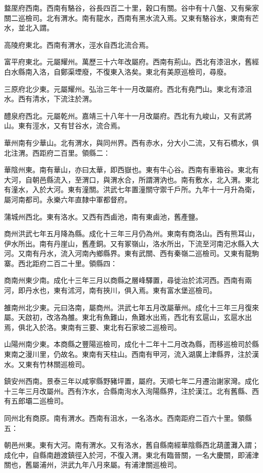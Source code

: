 盩厔府西南。西南有駱谷，谷長四百二十里，穀口有關。谷中有十八盤、又有柴家關二巡檢司。北有渭水。南有龍水，西南有黑水流入焉。又東有駱谷水，東南有芒水，並北入謂。

高陵府東北。西南有渭水，涇水自西北流合焉。

富平府東北。元屬耀州。萬歷三十六年改屬府。西南有荊山。西北有漆沮水，舊經白水縣南入洛，自鄭渠堙廢，不復東入洛矣。東北有美原巡檢司，尋廢。

三原府北少東。元屬耀州。弘治三年十一月改屬府。西北有堯門山。東北有漆沮水。西有清水，下流注於渭。

醴泉府西北。元屬乾州。嘉靖三十八年十一月改屬府。西北有九峻山，又有武將山。東有涇水，又有甘谷水，流合焉。

華州南有少華山。北有渭水，與同州界。西有赤水，分大小二流，又有石橋水，俱北注渭。西距府二百里。領縣二：

華陰州東。南有華山，亦曰太華，即西嶽也。東有牛心谷。西南有車箱谷。東北有大河，自朝邑縣流入，至渭口，與渭水合，所謂渭汭也。南有敷水，北入渭。東北有潼水，入於大河。東有潼關。洪武七年置潼關守禦千戶所。九年十一月升為衛，屬河南都司。永樂六年直隸中軍都督府。

蒲城州西北。東有洛水。又西有西鹵池，南有東鹵池，舊產鹽。

商州洪武七年五月降為縣。成化十三年三月仍為州。東南有商洛山。西有熊耳山，伊水所出。南有丹崖山，舊產銅。又有冢嶺山，洛水所出，下流至河南汜水縣入大河。又南有丹水，流入河南內鄉縣界。東有武關、西有秦嶺二巡檢司。又東有龍駒寨。西北距府二百二十里。領縣四：

商南州東少南。成化十三年三月以商縣之層峰驛置，尋徙治於沭河西。西南有兩河，即丹水也，東有沭河，南有挾川，俱入焉。東有富水堡巡檢司。

雒南州北少東。元曰洛南，屬商州。洪武七年五月改屬華州。成化十三年三月復來屬。天啟初，改洛為雒。東北有魚難山，魚難水出焉，西北有玄扈山，玄扈水出焉，俱北入於洛。東南有三要、東北有石家坡二巡檢司。

山陽州南少東。本商縣之豐陽巡檢司，成化十二年十二月改為縣，而移巡檢司於縣東南之漫川里，仍故名。東南有天柱山。西南有甲河，流入湖廣上津縣界，注於漢水。又東有竹林關巡檢司。

鎮安州西南。景泰三年以咸寧縣野豬坪置，屬府。天順七年二月遷治謝家灣。成化十三年三月改屬州。西有泎水，合縣南洵水入洵陽縣界，注於漢江。北有舊縣、西有五郎壩二巡檢司。

同州北有商原。南有渭水。西南有沮水，一名洛水。西南距府二百六十里。領縣五：

朝邑州東。東有大河。南有渭水。又有洛水，舊自縣南經華陰縣西北葫蘆灘入謂；成化中，自縣南趙渡鎮徑入於河，不復入渭。東北有臨晉關，一名大慶關，即浦津關也，舊屬浦州，洪武九年八月來屬。有浦津關巡檢司。

